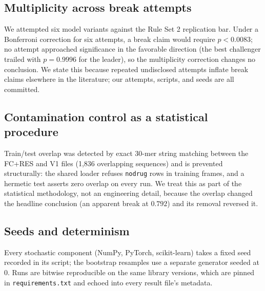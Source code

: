 \subsection{Multiplicity across break attempts}
We attempted six model variants against the Rule Set 2 replication bar.
Under a Bonferroni correction for six attempts, a break claim would require
$p < 0.0083$; no attempt approached significance in the favorable direction
(the best challenger trailed with $p = 0.9996$ for the leader), so the
multiplicity correction changes no conclusion. We state this because
repeated undisclosed attempts inflate break claims elsewhere in the
literature; our attempts, scripts, and seeds are all committed.

\subsection{Contamination control as a statistical procedure}
Train/test overlap was detected by exact 30-mer string matching between the
FC+RES and V1 files (1{,}836 overlapping sequences) and is prevented
structurally: the shared loader refuses \texttt{nodrug} rows in training
frames, and a hermetic test asserts zero overlap on every run. We treat
this as part of the statistical methodology, not an engineering detail,
because the overlap changed the headline conclusion (an apparent break at
$0.792$) and its removal reversed it.

\subsection{Seeds and determinism}
Every stochastic component (NumPy, PyTorch, scikit-learn) takes a fixed seed
recorded in its script; the bootstrap resamples use a separate generator
seeded at $0$. Runs are bitwise reproducible on the same library versions,
which are pinned in \texttt{requirements.txt} and echoed into every result
file's metadata.
